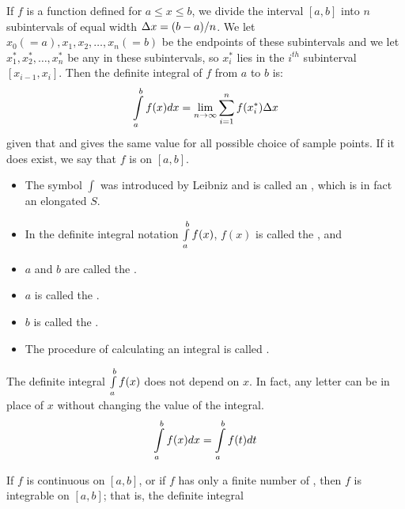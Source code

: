         \par If $f$ is a function defined for $a \leq x \leq b$, we divide the interval $[a, b]$
        into $n$ subintervals of equal width $\Delta x = (b - a)/n$. We let $x_{0} (= a), x_{1}, x_{2},
        \ldots, x_{n} (= b)$ be the endpoints of these subintervals and we let $x_{1}^{*}, x_{2}^{*},
        \ldots, x_{n}^{*}$ be any  in these subintervals, so $x_{i}^{*}$ lies in
        the $i^{th}$ subinterval $[x_{i - 1}, x_{i}]$. Then the definite integral of $f$ from
        $a$ to $b$ is:
        \begin{equation}
            \int\limits _{a}^{b} f(x) dx = \lim_{n \to \infty} \sum\limits _{i = 1}^{n} f(x_{i}^{*}) \Delta x
        \end{equation}
        given that  and gives the same value for all possible choice of
        sample points. If it does exist, we say that $f$ is  on $[a, b]$.
        \begin{itemize}
            \item The symbol $\int$ was introduced by Leibniz and is called an ,
                which is in fact an elongated $S$.
            \item In the definite integral notation $\int\limits _{a}^{b} f(x)$, $f(x)$ is called the
                , and
            \item $a$ and $b$ are called the .
            \item $a$ is called the .
            \item $b$ is called the .
            \item The procedure of calculating an integral is called .
        \end{itemize}
        \par The definite integral $\int\limits _{a}^{b} f(x)$ does not depend on $x$. In fact, any letter
        can be in place of $x$ without changing the value of the integral.
        \begin{equation}
            \int\limits _{a}^{b} f(x) dx = \int\limits _{a}^{b} f(t) dt
        \end{equation}
        \par If $f$ is continuous on $[a, b]$, or if $f$ has only a finite number of , then $f$ is integrable on $[a, b]$; that is, the definite integral
